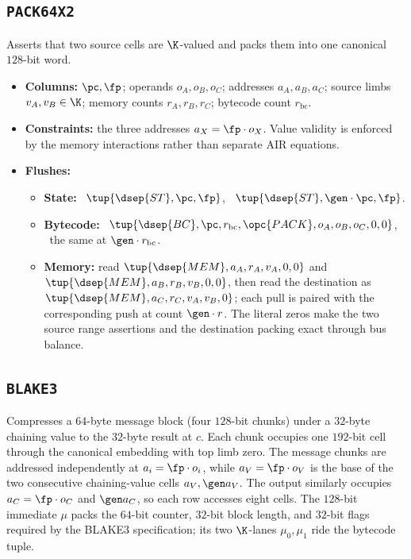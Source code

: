 \subsection{\texttt{PACK64X2}}\label{sec:tab-pack64x2}

Asserts that two source cells are $\K$-valued and packs them into one canonical $128$-bit word.
\begin{itemize}
\item \textbf{Columns:} $\pc,\fp$; operands $o_A,o_B,o_C$; addresses $a_A,a_B,a_C$; source limbs $v_A,v_B\in\K$; memory counts $r_A,r_B,r_C$; bytecode count $r_{\mathrm{bc}}$.
\item \textbf{Constraints:} the three addresses $a_X=\fp\cdot o_X$. Value validity is enforced by the memory interactions rather than separate AIR equations.
\item \textbf{Flushes:}
  \begin{itemize}
  \item \textbf{State:} \pull\ $\tup{\dsep{ST},\pc,\fp}$, \push\ $\tup{\dsep{ST},\gen\cdot\pc,\fp}$.
  \item \textbf{Bytecode:} \pull\ $\tup{\dsep{BC},\pc,r_{\mathrm{bc}},\opc{PACK},o_A,o_B,o_C,0,0}$, \push\ the same at $\gen\cdot r_{\mathrm{bc}}$.
  \item \textbf{Memory:} read $\tup{\dsep{MEM},a_A,r_A,v_A,0,0}$ and $\tup{\dsep{MEM},a_B,r_B,v_B,0,0}$, then read the destination as $\tup{\dsep{MEM},a_C,r_C,v_A,v_B,0}$; each pull is paired with the corresponding push at count $\gen\cdot r$. The literal zeros make the two source range assertions and the destination packing exact through bus balance.
  \end{itemize}
\end{itemize}

\subsection{\texttt{BLAKE3}}\label{sec:tab-blake3}

Compresses a $64$-byte message block (four $128$-bit chunks) under a $32$-byte chaining value to the $32$-byte result at $c$. Each chunk occupies one $192$-bit cell through the canonical embedding with top limb zero. The message chunks are addressed independently at $a_i=\fp\cdot o_i$, while $a_V=\fp\cdot o_V$ is the base of the two consecutive chaining-value cells $a_V,\gen a_V$. The output similarly occupies $a_C=\fp\cdot o_C$ and $\gen a_C$, so each row accesses eight cells. The $128$-bit immediate $\mu$ packs the $64$-bit counter, $32$-bit block length, and $32$-bit flags required by the BLAKE3 specification; its two $\K$-lanes $\mu_0,\mu_1$ ride the bytecode tuple.

